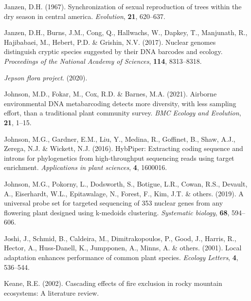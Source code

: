 \documentclass[
]{article}
\newlength{\cslhangindent}
\newlength{\cslentryspacingunit} %
\newenvironment{CSLReferences}[2] %
 {%
  \setlength{\parindent}{0pt}
  \ifodd #1
  \let\oldpar\par
  \def\par{\hangindent=\cslhangindent\oldpar}
  \fi
  \setlength{\parskip}{#2\cslentryspacingunit}
 }%
 {}
\begin{document}
\begin{CSLReferences}{1}{0}
\leavevmode{}%
Janzen, D.H. (1967). Synchronization of sexual reproduction of trees
within the dry season in central america. \emph{Evolution}, \textbf{21},
620--637.

\leavevmode{}%
Janzen, D.H., Burns, J.M., Cong, Q., Hallwachs, W., Dapkey, T.,
Manjunath, R., Hajibabaei, M., Hebert, P.D. \& Grishin, N.V. (2017).
Nuclear genomes distinguish cryptic species suggested by their DNA
barcodes and ecology. \emph{Proceedings of the National Academy of
Sciences}, \textbf{114}, 8313--8318.

\leavevmode{}%
\emph{Jepson flora project}. (2020).

\leavevmode{}%
Johnson, M.D., Fokar, M., Cox, R.D. \& Barnes, M.A. (2021). Airborne
environmental DNA metabarcoding detects more diversity, with less
sampling effort, than a traditional plant community survey. \emph{BMC
Ecology and Evolution}, \textbf{21}, 1--15.

\leavevmode{}%
Johnson, M.G., Gardner, E.M., Liu, Y., Medina, R., Goffinet, B., Shaw,
A.J., Zerega, N.J. \& Wickett, N.J. (2016). HybPiper: Extracting coding
sequence and introns for phylogenetics from high-throughput sequencing
reads using target enrichment. \emph{Applications in plant sciences},
\textbf{4}, 1600016.

\leavevmode{}%
Johnson, M.G., Pokorny, L., Dodsworth, S., Botigue, L.R., Cowan, R.S.,
Devault, A., Eiserhardt, W.L., Epitawalage, N., Forest, F., Kim, J.T. \&
others. (2019). A universal probe set for targeted sequencing of 353
nuclear genes from any flowering plant designed using k-medoids
clustering. \emph{Systematic biology}, \textbf{68}, 594--606.

\leavevmode{}%
Joshi, J., Schmid, B., Caldeira, M., Dimitrakopoulos, P., Good, J.,
Harris, R., Hector, A., Huss-Danell, K., Jumpponen, A., Minns, A. \&
others. (2001). Local adaptation enhances performance of common plant
species. \emph{Ecology Letters}, \textbf{4}, 536--544.

\leavevmode{}%
Keane, R.E. (2002). Cascading effects of fire exclusion in rocky
mountain ecosystems: A literature review.


\end{CSLReferences}
\end{document}
